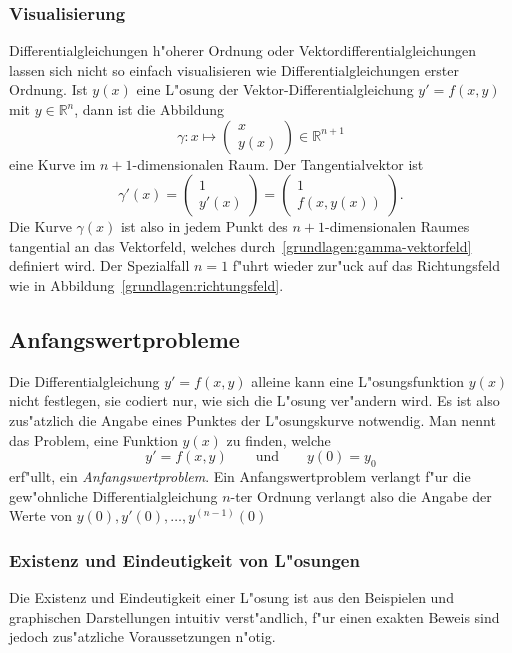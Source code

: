 \subsubsection{Visualisierung}
%
Differentialgleichungen h"oherer Ordnung oder Vektordifferentialgleichungen
lassen sich nicht so einfach visualisieren wie Differentialgleichungen
erster Ordnung.
Ist $y(x)$ eine L"osung der Vektor-Differentialgleichung $y'=f(x,y)$
mit $y\in\mathbb R^n$, dann ist die Abbildung
\[
\gamma\colon
x\mapsto\begin{pmatrix}
x\\
y(x)
\end{pmatrix}\in\mathbb R^{n+1}
\]
eine Kurve im $n+1$-dimensionalen Raum. 
Der Tangentialvektor ist
\begin{equation}
\gamma'(x)
=
\begin{pmatrix}1\\y'(x)\end{pmatrix}
=
\begin{pmatrix}1\\f(x,y(x))\end{pmatrix}.
\label{grundlagen:gamma-vektorfeld}
\end{equation}
Die Kurve $\gamma(x)$ ist also in jedem Punkt des $n+1$-dimensionalen
Raumes tangential an das Vektorfeld, welches
durch~\eqref{grundlagen:gamma-vektorfeld} definiert wird.
Der Spezialfall $n=1$ f"uhrt wieder zur"uck auf das Richtungsfeld
wie in Abbildung~\ref{grundlagen:richtungsfeld}.

\subsection{Anfangswertprobleme\label{section:anfangswertprobleme}}
%
Die Differentialgleichung $y'=f(x,y)$ alleine kann eine L"osungsfunktion
$y(x)$ nicht festlegen, sie codiert nur, wie sich die L"osung ver"andern wird.
Es ist also zus"atzlich die Angabe eines Punktes der L"osungskurve
notwendig.
Man nennt das Problem, eine Funktion $y(x)$ zu finden, welche
\[
y'=f(x,y)
\qquad
\text{und}
\qquad
y(0)=y_0
\]
erf"ullt, ein {\em Anfangswertproblem}.
Ein Anfangswertproblem verlangt f"ur die gew"ohnliche Differentialgleichung
$n$-ter Ordnung verlangt also die Angabe der Werte von
$y(0),y'(0),\dots,y^{(n-1)}(0)$

\subsubsection{Existenz und Eindeutigkeit von L"osungen}
Die Existenz und Eindeutigkeit einer L"osung ist aus den Beispielen und
graphischen Darstellungen intuitiv verst"andlich, f"ur einen exakten
Beweis sind jedoch zus"atzliche Voraussetzungen n"otig.

